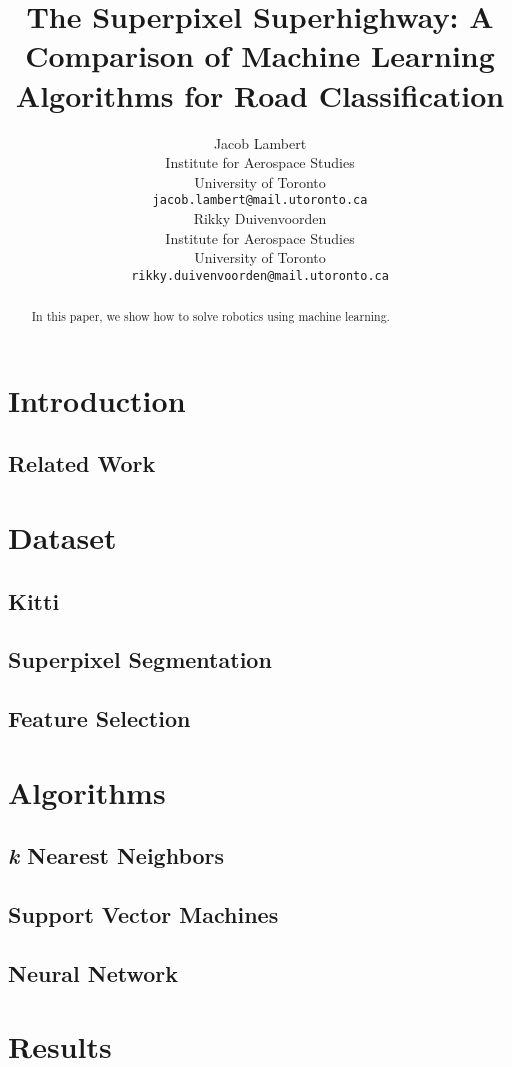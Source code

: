 \documentclass{article} %
\title{The Superpixel Superhighway: A Comparison of Machine Learning Algorithms for Road Classification}
\author{
Jacob Lambert\\
Institute for Aerospace Studies\\
University of Toronto\\
\texttt{jacob.lambert@mail.utoronto.ca} \\
\And
Rikky Duivenvoorden\\
Institute for Aerospace Studies\\
University of Toronto\\
\texttt{rikky.duivenvoorden@mail.utoronto.ca} \\
}
\begin{document}
\maketitle

\begin{abstract}
In this paper, we show how to solve robotics using machine learning.
\end{abstract}

\section{Introduction}

\subsection{Related Work}

\section{Dataset}
\subsection{Kitti}
\subsection{Superpixel Segmentation}
\subsection{Feature Selection}

\section{Algorithms}
\subsection{\textit{k} Nearest Neighbors}
\subsection{Support Vector Machines}
\subsection{Neural Network}

\section{Results}
\end{document}
